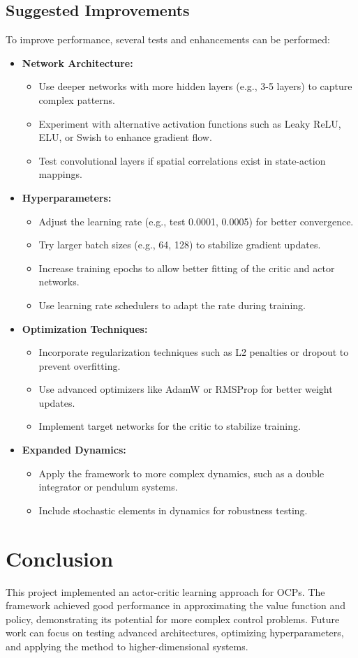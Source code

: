 \documentclass{article}
\begin{document}
\subsection{Suggested Improvements}
To improve performance, several tests and enhancements can be performed:
\begin{itemize}
    \item \textbf{Network Architecture:}
    \begin{itemize}
        \item Use deeper networks with more hidden layers (e.g., 3-5 layers) to capture complex patterns.
        \item Experiment with alternative activation functions such as Leaky ReLU, ELU, or Swish to enhance gradient flow.
        \item Test convolutional layers if spatial correlations exist in state-action mappings.
    \end{itemize}
    \item \textbf{Hyperparameters:}
    \begin{itemize}
        \item Adjust the learning rate (e.g., test 0.0001, 0.0005) for better convergence.
        \item Try larger batch sizes (e.g., 64, 128) to stabilize gradient updates.
        \item Increase training epochs to allow better fitting of the critic and actor networks.
        \item Use learning rate schedulers to adapt the rate during training.
    \end{itemize}
    \item \textbf{Optimization Techniques:}
    \begin{itemize}
        \item Incorporate regularization techniques such as L2 penalties or dropout to prevent overfitting.
        \item Use advanced optimizers like AdamW or RMSProp for better weight updates.
        \item Implement target networks for the critic to stabilize training.
    \end{itemize}
    \item \textbf{Expanded Dynamics:}
    \begin{itemize}
        \item Apply the framework to more complex dynamics, such as a double integrator or pendulum systems.
        \item Include stochastic elements in dynamics for robustness testing.
    \end{itemize}
\end{itemize}

\section{Conclusion}
This project implemented an actor-critic learning approach for OCPs. The framework achieved good performance in approximating the value function and policy, demonstrating its potential for more complex control problems. Future work can focus on testing advanced architectures, optimizing hyperparameters, and applying the method to higher-dimensional systems.
\end{document}
